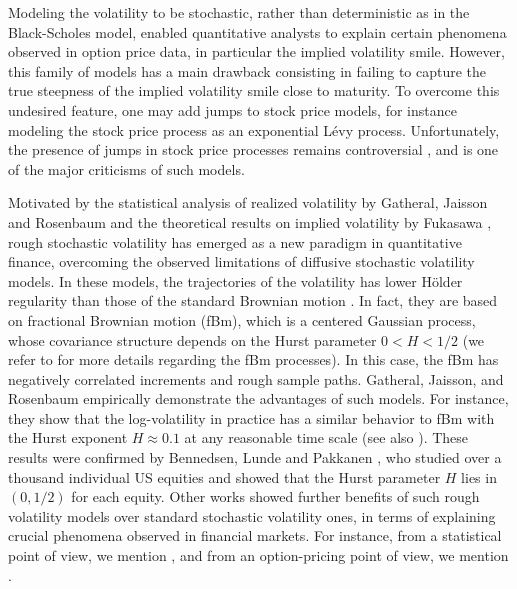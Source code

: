 Modeling the volatility to be stochastic, rather than deterministic as in the Black-Scholes model, enabled quantitative analysts to  explain certain phenomena observed in option price data, in particular the implied volatility smile. However, this family of models has a  main drawback consisting in failing  to capture the true steepness of the implied volatility smile close to maturity. To overcome this undesired feature, one may add jumps to stock price models, for instance modeling the stock price process as an exponential L\'evy process. Unfortunately, the presence of jumps in stock price processes remains controversial \cite{christensen2014fact,bajgrowicz2015jumps}, and is one of the major criticisms of such models. 



Motivated by the statistical analysis of realized volatility by Gatheral, Jaisson and Rosenbaum \cite{gatheral2014volatility} and the theoretical results on implied volatility by Fukasawa \cite{fukasawa2011asymptotic}, rough stochastic volatility has emerged as a new paradigm in quantitative finance, overcoming the observed limitations of  diffusive stochastic volatility models. In these models, the trajectories of the volatility  has lower H\"older regularity than those of the standard Brownian motion \cite{gatheral2014volatility,bayer2016pricing}. In fact, they are based on fractional Brownian motion (fBm), which  is a centered Gaussian process, whose covariance structure depends on the Hurst parameter $0<H<1/2$ (we refer to  \cite{mandelbrot1968fractional,coutin07introduction,biagini2008stochastic} for more details regarding the fBm processes). In this case, the fBm has negatively correlated increments and rough sample paths.   Gatheral, Jaisson, and Rosenbaum \cite{gatheral2014volatility}  empirically demonstrate the advantages of such models. For instance, they show that the log-volatility in practice has a similar behavior to  fBm with the Hurst exponent $H \approx 0.1$ at any reasonable time scale (see also  \cite{gatheral2014volatility_2}).  These results were confirmed  by Bennedsen, Lunde and Pakkanen \cite{bennedsen2016decoupling}, who studied over a thousand individual US equities and showed that the Hurst parameter $H$ lies in $(0,1/2)$ for each equity. Other  works showed further benefits of  such rough volatility models over  standard stochastic volatility ones,   in terms of explaining crucial phenomena  observed in  financial markets. For instance, from a statistical point of view, we mention \cite{gatheral2014volatility,bennedsen2016decoupling}, and from an option-pricing point of view, we mention \cite{bayer2016pricing}.
   

